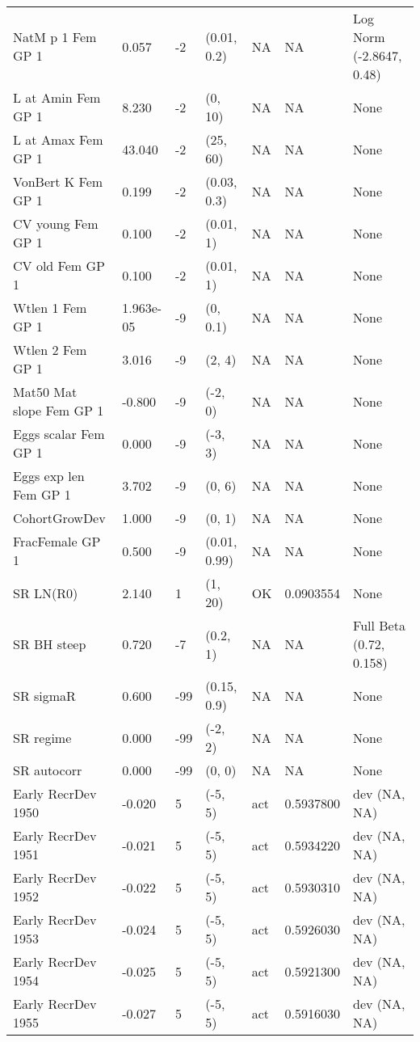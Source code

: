 \documentclass[11pt,
  english,
  a4paper,
]{article}
\begin{document}
\begin{landscape}
\begin{longtable}[t]{>{\raggedright\arraybackslash}p{6cm}lllll>{\raggedright\arraybackslash}p{4cm}}
\endfoot
\bottomrule
\endlastfoot
NatM p 1 Fem GP 1 & 0.057 & -2 & (0.01, 0.2) & NA & NA & Log Norm (-2.8647, 0.48)\\
L at Amin Fem GP 1 & 8.230 & -2 & (0, 10) & NA & NA & None\\
L at Amax Fem GP 1 & 43.040 & -2 & (25, 60) & NA & NA & None\\
VonBert K Fem GP 1 & 0.199 & -2 & (0.03, 0.3) & NA & NA & None\\
CV young Fem GP 1 & 0.100 & -2 & (0.01, 1) & NA & NA & None\\
CV old Fem GP 1 & 0.100 & -2 & (0.01, 1) & NA & NA & None\\
Wtlen 1 Fem GP 1 & 1.963e-05 & -9 & (0, 0.1) & NA & NA & None\\
Wtlen 2 Fem GP 1 & 3.016 & -9 & (2, 4) & NA & NA & None\\
Mat50%
Mat slope Fem GP 1 & -0.800 & -9 & (-2, 0) & NA & NA & None\\
Eggs scalar Fem GP 1 & 0.000 & -9 & (-3, 3) & NA & NA & None\\
Eggs exp len Fem GP 1 & 3.702 & -9 & (0, 6) & NA & NA & None\\
CohortGrowDev & 1.000 & -9 & (0, 1) & NA & NA & None\\
FracFemale GP 1 & 0.500 & -9 & (0.01, 0.99) & NA & NA & None\\
SR LN(R0) & 2.140 & 1 & (1, 20) & OK & 0.0903554 & None\\
SR BH steep & 0.720 & -7 & (0.2, 1) & NA & NA & Full Beta (0.72, 0.158)\\
SR sigmaR & 0.600 & -99 & (0.15, 0.9) & NA & NA & None\\
SR regime & 0.000 & -99 & (-2, 2) & NA & NA & None\\
SR autocorr & 0.000 & -99 & (0, 0) & NA & NA & None\\
Early RecrDev 1950 & -0.020 & 5 & (-5, 5) & act & 0.5937800 & dev (NA, NA)\\
Early RecrDev 1951 & -0.021 & 5 & (-5, 5) & act & 0.5934220 & dev (NA, NA)\\
Early RecrDev 1952 & -0.022 & 5 & (-5, 5) & act & 0.5930310 & dev (NA, NA)\\
Early RecrDev 1953 & -0.024 & 5 & (-5, 5) & act & 0.5926030 & dev (NA, NA)\\
Early RecrDev 1954 & -0.025 & 5 & (-5, 5) & act & 0.5921300 & dev (NA, NA)\\
Early RecrDev 1955 & -0.027 & 5 & (-5, 5) & act & 0.5916030 & dev (NA, NA)\\

\end{longtable}
\end{landscape}
\end{document}
